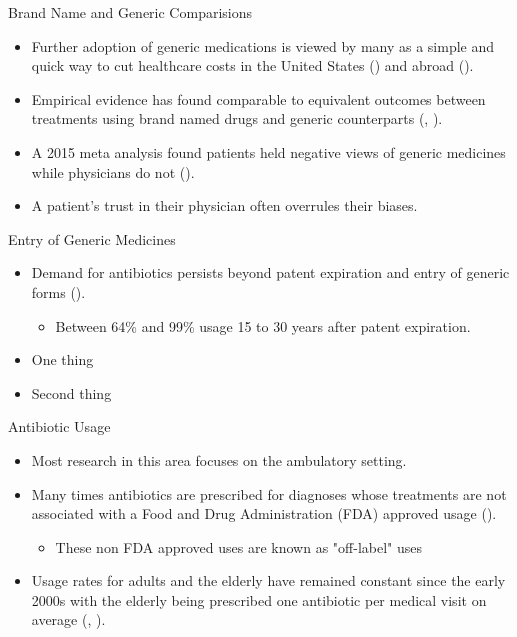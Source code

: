 \documentclass{beamer}
\begin{document}
\begin{frame}{Brand Name and Generic Comparisions}
\begin{itemize}
\item Further adoption of generic medications is viewed by many as a simple and quick way to cut healthcare costs in the United States (\cite{walensky_economic_2013}) and abroad (\cite{mercanoglu_evaluation_2018}).
\item Empirical evidence has found comparable to equivalent outcomes between treatments using brand named drugs and generic counterparts (\cite{lin_comparative_2017}, \cite{desai_comparative_2019}).
\item A 2015 meta analysis found patients held negative views of generic medicines while physicians do not (\cite{dunne_what_2015}).
\item A patient's trust in their physician often overrules their biases.
\end{itemize}
\end{frame}

\begin{frame}{Entry of Generic Medicines}
\begin{itemize}
\item Demand for antibiotics persists beyond patent expiration and entry of generic forms (\cite{mansley_utilization_2008}).
\begin{itemize}
  \item Between 64\% and 99\% usage 15 to 30 years after patent expiration.
\end{itemize}
\item One thing
\item Second thing
\end{itemize}
\end{frame}

\begin{frame}{Antibiotic Usage}
\begin{itemize}
\item Most research in this area focuses on the ambulatory setting.
\item Many times antibiotics are prescribed for diagnoses whose treatments are not associated with a Food and Drug Administration (FDA) approved usage (\cite{almalki_off-label_2016}).
\begin{itemize}
  \item These non FDA approved uses are known as "off-label" uses 
\end{itemize}
\item Usage rates for adults and the elderly have remained constant since the early 2000s with the elderly being prescribed one antibiotic per medical visit on average (\cite{roumie_trends_2005}, \cite{kabbani_outpatient_2018}).
\end{itemize}
\end{frame}
\end{document}

